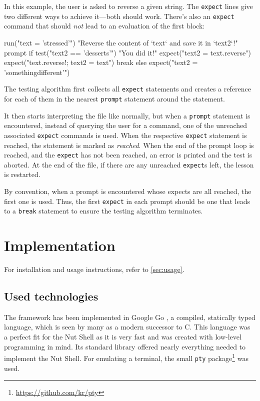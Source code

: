 \documentclass[paper=a4,twoside,abstract=on,cleardoublepage=empty,numbers=noenddot,toc=bib,12pt,appendixprefix=true]{scrreprt}
\begin{document}
In this example, the user is asked to reverse a given string. The \texttt{expect} lines give two different ways to achieve it---both should work. There's also an \texttt{expect} command that should \emph{not} lead to an evaluation of the first block:

\begin{nutsh}
run("text = 'stressed'")
"Reverse the content of `text` and save it in `text2`!"
prompt {
    if test("text2 == 'desserts'") {
        "You did it!"
        expect("text2 = text.reverse")
        expect("text.reverse!; text2 = text")
        break
    } else {
        expect("text2 = 'somethingdifferent'")
    }
}
\end{nutsh}

The testing algorithm first collects all \texttt{expect} statements and creates a reference for each of them in the nearest \texttt{prompt} statement around the statement.

It then starts interpreting the file like normally, but when a \texttt{prompt} statement is encountered, instead of querying the user for a command, one of the unreached associated \texttt{expect} commands is used. When the respective \texttt{expect} statement is reached, the statement is marked as \emph{reached}. When the end of the prompt loop is reached, and the \texttt{expect} has not been reached, an error is printed and the test is aborted. At the end of the file, if there are any unreached \texttt{expect}s left, the lesson is restarted.

By convention, when a prompt is encountered whose expects are all reached, the first one is used. Thus, the first \texttt{expect} in each prompt should be one that leads to a \texttt{break} statement to ensure the testing algorithm terminates.

\section{Implementation}
\label{sec:implementation}

For installation and usage instructions, refer to \cref{sec:usage}.

\subsection*{Used technologies}

The framework has been implemented in Google Go \cite{google13}, a compiled, statically typed language, which is seen by many as a modern successor to C. This language was a perfect fit for the Nut Shell as it is very fast and was created with low-level programming in mind. Its standard library offered nearly everything needed to implement the Nut Shell. For emulating a terminal, the small \texttt{pty} package\footnote{\url{https://github.com/kr/pty}} was used.
\end{document}
